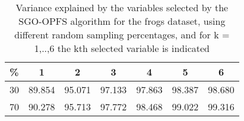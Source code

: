\begin{table}
	\begin{center}
		\begin{tabular}{c c c c c c c}
			\% & 1 & 2 & 3 & 4 & 5 & 6 \\
			\hline
			30 & 89.854 & 95.071 & 97.133 & 97.863 & 98.387 & 98.680 \\
			70 & 90.278 & 95.713 & 97.772 & 98.468 & 99.022 & 99.316 \\
		\end{tabular}
	\end{center}
	\caption{Variance explained by the variables selected by the SGO-OPFS algorithm for the frogs dataset, using different random sampling percentages, and for k = 1,..,6 the kth selected variable is indicated}
\end{table}